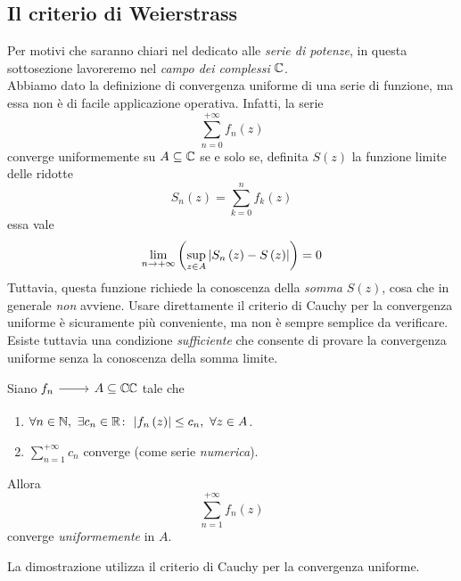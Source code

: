 \subsection{Il criterio di Weierstrass}
Per motivi che saranno chiari nel  dedicato alle \textit{serie di potenze}, in questa sottosezione lavoreremo nel \textit{campo dei complessi} $\mathbb{C}$.\\
Abbiamo dato la definizione di convergenza uniforme di una serie di funzione, ma essa non è di facile applicazione operativa. Infatti, la serie
\begin{equation*}
	\sum_{n=0}^{+\infty}f_n\left(z\right)
\end{equation*}
converge uniformemente su $A\subseteq\mathbb{C}$ se e solo se, definita $S\left(z\right)$ la funzione limite delle ridotte
\begin{equation*}
	S_n\left(z\right)=\sum_{k=0}^{n}f_k\left(z\right)
\end{equation*}
essa vale
\begin{equation*}
	\lim_{n\to+\infty}\left(\sup_{z\in A}\abs{S_n\left(z\right)-S\left(z\right)}\right)=0
\end{equation*}
Tuttavia, questa funzione richiede la conoscenza della \textit{somma} $S\left(z\right)$, cosa che in generale \textit{non} avviene. Usare direttamente il criterio di Cauchy per la convergenza uniforme è sicuramente più conveniente, ma non è sempre semplice da verificare. Esiste tuttavia una condizione \textit{sufficiente} che consente di provare la convergenza uniforme senza la conoscenza della somma limite.
\begin{propositionqed}\label{criteriodiweierstrass}
	Siano $\funz{f_n}{A\subseteq \complexset}{\complexset}$ tale che
	\begin{enumerate}[label=\alph*.]
		\item $\forall n\in \mathbb{N},\ \exists c_n\in\mathbb{R}\colon\ \abs{f_n\left(z\right)}\leq c_n,\ \forall z\in A$.
		\item $\displaystyle\sum_{n=1}^{+\infty}c_n$ converge (come serie \textit{numerica}).
	\end{enumerate}
Allora
\begin{equation*}
	\sum_{n=1}^{+\infty}f_n\left(z\right)
\end{equation*}
converge \textit{uniformemente} in $A$.
\end{propositionqed}
\begin{observe}
	La dimostrazione utilizza il criterio di Cauchy per la convergenza uniforme.
\end{observe}

